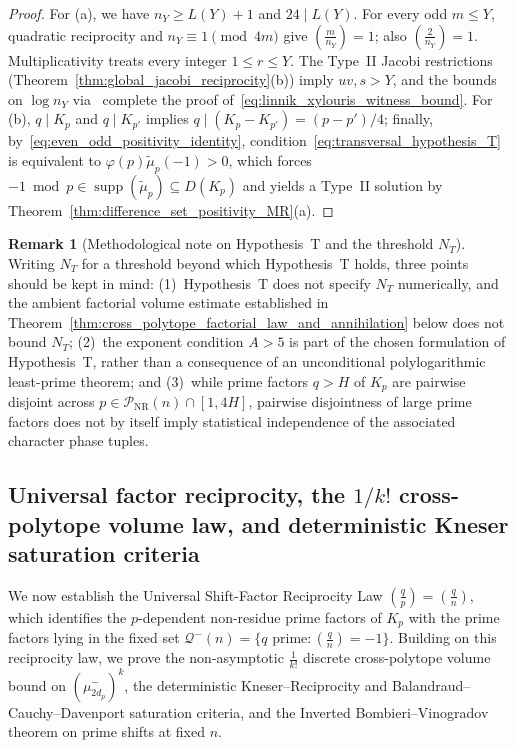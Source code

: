 \documentclass[11pt, a4paper]{article}
\theoremstyle{plain}
\theoremstyle{definition}
\newtheorem{remark}[theorem]{Remark}
\newcommand{\leg}[2]{\left(\frac{#1}{#2}\right)}
\begin{document}
\begin{proof}
For (a), we have $n_Y\ge L(Y)+1$ and $24\mid L(Y)$. For every odd $m\le Y$, quadratic reciprocity and $n_Y\equiv1\pmod{4m}$ give $\leg{m}{n_Y}=1$; also $\leg{2}{n_Y}=1$. Multiplicativity treats every integer $1\le r\le Y$. The Type~II Jacobi restrictions (Theorem~\ref{thm:global_jacobi_reciprocity}(b)) imply $uv,s>Y$, and the bounds on $\log n_Y$ via~\cite{xylouris2011} complete the proof of~\eqref{eq:linnik_xylouris_witness_bound}. For (b), $q\mid K_p$ and $q\mid K_{p'}$ implies $q\mid(K_p-K_{p'})=(p-p')/4$; finally, by~\eqref{eq:even_odd_positivity_identity}, condition~\eqref{eq:transversal_hypothesis_T} is equivalent to $\varphi(p)\widetilde{\mu}_p(-1)>0$, which forces $-1\bmod p\in\operatorname{supp}(\widetilde{\mu}_p)\subseteq D(K_p)$ and yields a Type~II solution by Theorem~\ref{thm:difference_set_positivity_MR}(a).
\end{proof}

\begin{remark}[Methodological note on Hypothesis~T and the threshold $N_T$]\label{rem:hypothesis_T_scope}
Writing $N_T$ for a threshold beyond which Hypothesis~T holds, three points should be kept in mind: (1)~Hypothesis~T does not specify $N_T$ numerically, and the ambient factorial volume estimate established in Theorem~\ref{thm:cross_polytope_factorial_law_and_annihilation} below does not bound $N_T$; (2)~the exponent condition $A>5$ is part of the chosen formulation of Hypothesis~T, rather than a consequence of an unconditional polylogarithmic least-prime theorem; and (3)~while prime factors $q>H$ of $K_p$ are pairwise disjoint across $p\in\mathcal{P}_{\mathrm{NR}}(n)\cap[1,4H]$, pairwise disjointness of large prime factors does not by itself imply statistical independence of the associated character phase tuples.
\end{remark}

\subsection{Universal factor reciprocity, the $1/k!$ cross-polytope volume law, and deterministic Kneser saturation criteria}\label{subsec:reciprocity_factorial_kneser}

We now establish the Universal Shift-Factor Reciprocity Law $\leg{q}{p}=\leg{q}{n}$, which identifies the $p$-dependent non-residue prime factors of $K_p$ with the prime factors lying in the fixed set $\mathcal{Q}^{-}(n)=\{q\text{ prime}:\leg{q}{n}=-1\}$. Building on this reciprocity law, we prove the non-asymptotic $\frac{1}{k!}$ discrete cross-polytope volume bound on $(\mu_{2d_p}^{-})^{k}$, the deterministic Kneser--Reciprocity and Balandraud--Cauchy--Davenport saturation criteria, and the Inverted Bombieri--Vinogradov theorem on prime shifts at fixed $n$.
\end{document}
